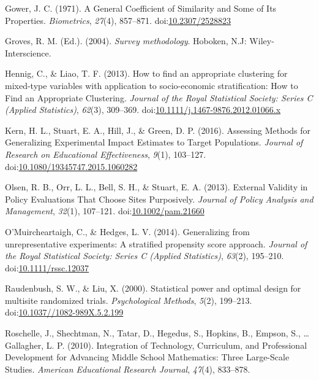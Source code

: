 \documentclass[man,floatsintext]{apa6}
\theoremstyle{definition}
\theoremstyle{definition}
\theoremstyle{definition}
\theoremstyle{remark}
\begin{document}
\leavevmode\hypertarget{ref-gowerGeneralCoefficientSimilarity1971}{}%
Gower, J. C. (1971). A General Coefficient of Similarity and Some of Its
Properties. \emph{Biometrics}, \emph{27}(4), 857--871.
doi:\href{https://doi.org/10.2307/2528823}{10.2307/2528823}

\leavevmode\hypertarget{ref-grovesSurveyMethodology2004}{}%
Groves, R. M. (Ed.). (2004). \emph{Survey methodology}. Hoboken, N.J:
Wiley-Interscience.

\leavevmode\hypertarget{ref-hennigHowFindAppropriate2013}{}%
Hennig, C., \& Liao, T. F. (2013). How to find an appropriate clustering
for mixed-type variables with application to socio-economic
stratification: How to Find an Appropriate Clustering. \emph{Journal of
the Royal Statistical Society: Series C (Applied Statistics)},
\emph{62}(3), 309--369.
doi:\href{https://doi.org/10.1111/j.1467-9876.2012.01066.x}{10.1111/j.1467-9876.2012.01066.x}

\leavevmode\hypertarget{ref-kernAssessingMethodsGeneralizing2016}{}%
Kern, H. L., Stuart, E. A., Hill, J., \& Green, D. P. (2016). Assessing
Methods for Generalizing Experimental Impact Estimates to Target
Populations. \emph{Journal of Research on Educational Effectiveness},
\emph{9}(1), 103--127.
doi:\href{https://doi.org/10.1080/19345747.2015.1060282}{10.1080/19345747.2015.1060282}

\leavevmode\hypertarget{ref-olsenExternalValidityPolicy2013}{}%
Olsen, R. B., Orr, L. L., Bell, S. H., \& Stuart, E. A. (2013). External
Validity in Policy Evaluations That Choose Sites Purposively.
\emph{Journal of Policy Analysis and Management}, \emph{32}(1),
107--121.
doi:\href{https://doi.org/10.1002/pam.21660}{10.1002/pam.21660}

\leavevmode\hypertarget{ref-omuircheartaighGeneralizingUnrepresentativeExperiments2014}{}%
O'Muircheartaigh, C., \& Hedges, L. V. (2014). Generalizing from
unrepresentative experiments: A stratified propensity score approach.
\emph{Journal of the Royal Statistical Society: Series C (Applied
Statistics)}, \emph{63}(2), 195--210.
doi:\href{https://doi.org/10.1111/rssc.12037}{10.1111/rssc.12037}

\leavevmode\hypertarget{ref-raudenbushStatisticalPowerOptimal2000}{}%
Raudenbush, S. W., \& Liu, X. (2000). Statistical power and optimal
design for multisite randomized trials. \emph{Psychological Methods},
\emph{5}(2), 199--213.
doi:\href{https://doi.org/10.1037//1082-989X.5.2.199}{10.1037//1082-989X.5.2.199}

\leavevmode\hypertarget{ref-roschelleIntegrationTechnologyCurriculum2010}{}%
Roschelle, J., Shechtman, N., Tatar, D., Hegedus, S., Hopkins, B.,
Empson, S., \ldots{} Gallagher, L. P. (2010). Integration of Technology,
Curriculum, and Professional Development for Advancing Middle School
Mathematics: Three Large-Scale Studies. \emph{American Educational
Research Journal}, \emph{47}(4), 833--878.
\end{document}
